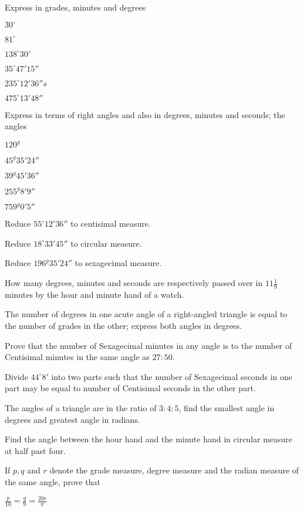 Express in grades, minutes and degrees

\item $30^{\circ}$
\item $81^{\circ}$
\item $138^{\circ}30'$
\item $35^{\circ}47'15''$
\item $235^{\circ}12'36''s$
\item $475^{\circ}13'48''$
\stopitemize

Express in terms of right angles and also in degrees, minutes and seconds; the angles

\item $120^g$
\item $45^g35'24''$
\item $39^g45'36''$
\item $255^g8'9''$
\item $759^g0'5''$
\item Reduce $55^{\circ}12'36''$ to centisimal measure.
\item Reduce $18^{\circ}33'45''$ to circular measure.
\item Reduce $196^g35'24''$ to sexagecimal measure.
\item How many degrees, minutes and seconds are respectively passed over in $11\frac{1}{9}$ minutes by the hour and minute hand
    of a watch.
\item The number of degrees in one acute angle of a right-angled triangle is equal to the number of grades in the other; express both
    angles in degrees.
\item Prove that the number of Sexagecimal minutes in any angle is to the number of Centisimal minutes in the same angle as
    $27:50.$
\item Divide $44^{\circ}8'$ into two parts such that the number of Sexagecimal seconds in one part may be equal to number of
    Centisimal seconds in the other part.
\item The angles of a triangle are in the ratio of $3:4:5$, find the smallest angle in degrees and greatest angle in radians.
\item Find the angle between the hour hand and the minute hand in circular measure at half past four.
\item If $p, q$ and $r$ denote the grade measure, degree measure and the radian measure of the same angle, prove that
  \startitemize[i]
    \item $\frac{p}{10} = \frac{q}{9} = \frac{20r}{\pi}$
